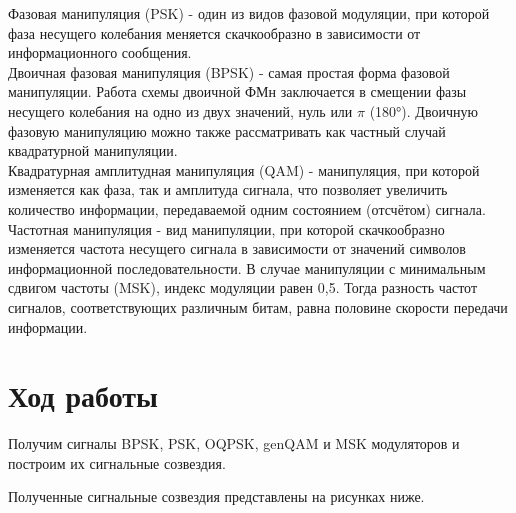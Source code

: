 \documentclass[a4paper]{article}
\begin{document}
Фазовая манипуляция (PSK) - один из видов фазовой модуляции, при которой фаза несущего колебания меняется скачкообразно в зависимости от информационного сообщения.\\

Двоичная фазовая манипуляция (BPSK) - самая простая форма фазовой манипуляции. Работа схемы двоичной ФМн заключается в смещении фазы несущего колебания на одно из двух значений, нуль или $\pi$  (180°). Двоичную фазовую манипуляцию можно также рассматривать как частный случай квадратурной манипуляции.\\

Квадратурная амплитудная манипуляция (QAM) - манипуляция, при которой изменяется как фаза, так и амплитуда сигнала, что позволяет увеличить количество информации, передаваемой одним состоянием (отсчётом) сигнала.\\

Частотная манипуляция - вид манипуляции, при которой скачкообразно изменяется частота несущего сигнала в зависимости от значений символов информационной последовательности. В случае манипуляции с минимальным сдвигом частоты (MSK), индекс модуляции равен 0,5. Тогда разность частот сигналов, соответствующих различным битам, равна половине скорости передачи информации.

 
\newpage 
\section{Ход работы}
Получим сигналы BPSK, PSK, OQPSK, genQAM и MSK модуляторов и построим их сигнальные созвездия.



Полученные сигнальные созвездия представлены на рисунках ниже.
\end{document}
